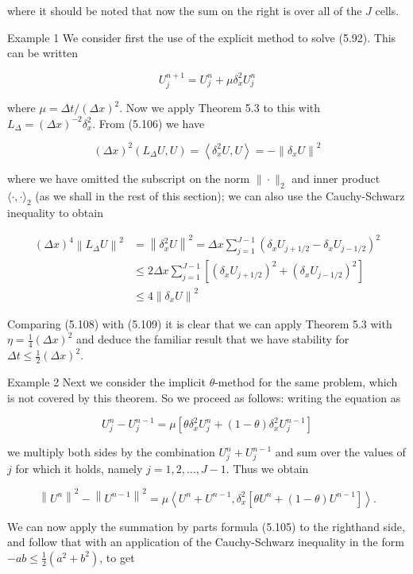 \documentclass[10pt]{article}
\begin{document}
where it should be noted that now the sum on the right is over all of the \(J\) cells.

Example 1 We consider first the use of the explicit method to solve (5.92). This can be written

\[
U_{j}^{n+1}=U_{j}^{n}+\mu \delta_{x}^{2} U_{j}^{n}
\]

where \(\mu=\Delta t /(\Delta x)^{2}\). Now we apply Theorem 5.3 to this with \(L_{\Delta}= (\Delta x)^{-2} \delta_{x}^{2}\). From (5.106) we have

\[
(\Delta x)^{2}\left(L_{\Delta} U, U\right)=\left\langle\delta_{x}^{2} U, U\right\rangle=-\left\|\delta_{x} U\right\|^{2}
\]

where we have omitted the subscript on the norm \(\|\cdot\|_{2}\) and inner product \(\langle\cdot, \cdot\rangle_{2}\) (as we shall in the rest of this section); we can also use the Cauchy-Schwarz inequality to obtain

\[
\begin{aligned}
(\Delta x)^{4}\left\|L_{\Delta} U\right\|^{2} & =\left\|\delta_{x}^{2} U\right\|^{2}=\Delta x \sum_{j=1}^{J-1}\left(\delta_{x} U_{j+1 / 2}-\delta_{x} U_{j-1 / 2}\right)^{2} \\
& \leq 2 \Delta x \sum_{j=1}^{J-1}\left[\left(\delta_{x} U_{j+1 / 2}\right)^{2}+\left(\delta_{x} U_{j-1 / 2}\right)^{2}\right] \\
& \leq 4\left\|\delta_{x} U\right\|^{2}
\end{aligned}
\]

Comparing (5.108) with (5.109) it is clear that we can apply Theorem 5.3 with \(\eta=\frac{1}{4}(\Delta x)^{2}\) and deduce the familiar result that we have stability for \(\Delta t \leq \frac{1}{2}(\Delta x)^{2}\).

Example 2 Next we consider the implicit \(\theta\)-method for the same problem, which is not covered by this theorem. So we proceed as follows: writing the equation as

\[
U_{j}^{n}-U_{j}^{n-1}=\mu\left[\theta \delta_{x}^{2} U_{j}^{n}+(1-\theta) \delta_{x}^{2} U_{j}^{n-1}\right]
\]

we multiply both sides by the combination \(U_{j}^{n}+U_{j}^{n-1}\) and sum over the values of \(j\) for which it holds, namely \(j=1,2, \ldots, J-1\). Thus we obtain

\[
\left\|U^{n}\right\|^{2}-\left\|U^{n-1}\right\|^{2}=\mu\left\langle U^{n}+U^{n-1}, \delta_{x}^{2}\left[\theta U^{n}+(1-\theta) U^{n-1}\right]\right\rangle .
\]

We can now apply the summation by parts formula (5.105) to the righthand side, and follow that with an application of the Cauchy-Schwarz inequality in the form \(-a b \leq \frac{1}{2}\left(a^{2}+b^{2}\right)\), to get
\end{document}
